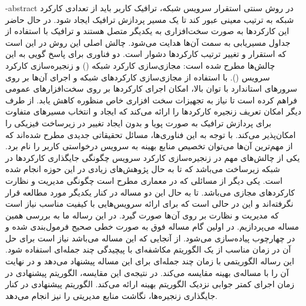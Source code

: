 
\fa-abstract{
    در روش سنتی استقرار سرویس شبکه، ترافیک کاربر باید از تعدادی کارکرد شبکه به ترتیب معینی عبور کند تا یک مسیر پردازش ترافیک ایجاد شود.
    در حال حاضر این کارکردها به صورت سخت‌افزاری به یکدیگر متصل هستند و ترافیک با استفاده از جداول مسیریابی به سمت آن‌ها هدایت می‌شود.
    چالش اصلی این روش در این است که استقرار و تغییر ترتیب کارکردها دشوار است.
    دو فناوری برای پاسخ گویی به این چالش‌ها مطرح شده است:
    مجازی‌سازی کارکرد شبکه () و زنجیره‌سازی کارکرد سرویس ().
    با استفاده از مجازی‌سازی کارکردهای شبکه و اجرای آن‌ها بر روی سرورهای استاندارد با توان بالا، امکان اجرای کارکردها بر روی سخت‌افزارهای عمومی فراهم کرده است
    تا نیاز به تجهیزات سخت افزاری خاص منظوره کاهش یابد.
    از طرف دیگر  امکان تعریف زنجیره کارکردها را ارائه می‌کند
    که ایجاد و انتخاب مسیرهای متفاوت برای پردازش ترافیک به صورت پویا و بدون ایجاد تغییر در زیرساخت فیزیکی را امکان‌پذیر می‌کند.
    با توجه به این فناوری‌ها، مسائل تحقیقاتی جدیدی مطرح شده‌اند که از مهم‌ترین آن‌ها می‌توان تخصیص منابع بهینه به سرویس درخواستی کاربر را نام برد.
    یکی از چالش‌های مهم در زنجیره‌سازی کارکرد سرویس چگونگی جایگذاری کارکرد‌ها در شبکه زیرساخت می‌باشد که تا به حال پژوهش‌های زیادی در این حوزه انجام شده است.
    یکی دیگر از مسائلی که در معماری  مطرح است چگونگی مدیریت و نظارت کارکردهای مجازی می‌باشد. تا به حال این دو مساله در کنار یکدیگر مورد مطالعه قرار نگرفته‌اند
    و این در حالی است که برای ارائه سرویس‌هایی با کیفیت مناسب نیاز است که مدیریت و نظارت بر روی آن‌ها صورت گیرد.
    در این رساله ما به بررسی همین مساله می‌پردازیم.
    در اولین گام مساله فوق به صورت خطی صحیح فرمول‌بندی شده و در چهارچوب  پیاده‌سازی می‌شود.
    از آنجایی که این مساله  می‌باشد نیاز است برای حل آن در زمان مناسب از یک الگوریتم مکاشفه‌ای با پیچیدگی چند جمله‌ای استفاده شود.
    این رساله الگوریتمی با زمان چند جمله‌ای برای این مساله پیشنهاد می‌دهد و در نهایت آن را با مساله‌ی بهینه مقایسه می‌کند.  
    در نتیجه‌ی این مقایسه، الگوریتم پیشنهادی در زمان اجرای کمتر جوابی نزدیک الگوریتم بهینه
    ارائه می‌کند. الگوریتم پیشنهادی در کنار جایگذاری زنجیره‌ها، نگاشت منابع مدیریتی را نیز انجام می‌دهد.
}





\AUTtitle
